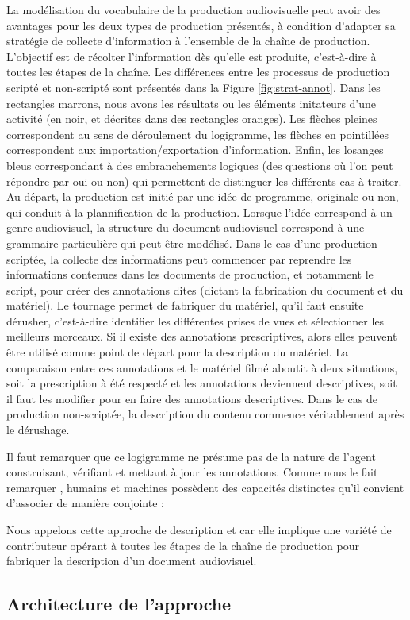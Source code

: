 La modélisation du vocabulaire de la production audiovisuelle peut avoir des avantages pour les deux types de production présentés, à condition d'adapter sa stratégie de collecte d'information à l'ensemble de la chaîne de production. 
L'objectif est de récolter l'information dès qu'elle est produite, c'est-à-dire à toutes les étapes de la chaîne. 
Les différences entre les processus de production scripté et non-scripté sont présentés dans la Figure \ref{fig:strat-annot}. 
Dans les rectangles marrons, nous avons les résultats ou les éléments initateurs d'une activité (en noir, et décrites dans des rectangles oranges).
Les flèches pleines correspondent au sens de déroulement du logigramme, les flèches en pointillées correspondent aux importation/exportation d'information. 
Enfin, les losanges bleus correspondant à des embranchements logiques (des questions où l'on peut répondre par oui ou non) qui permettent de distinguer les différents cas à traiter.
Au départ, la production est initié par une idée de programme, originale ou non, qui conduit à la plannification de la production.
Lorsque l'idée correspond à un genre audiovisuel, la structure du document audiovisuel correspond à une grammaire particulière qui peut être modélisé. 
Dans le cas d'une production scriptée, la collecte des informations peut commencer par reprendre les informations contenues dans les documents de production, et notamment le script, pour créer des annotations dites  (dictant la fabrication du document et du matériel).
Le tournage permet de fabriquer du matériel, qu'il faut ensuite dérusher, c'est-à-dire identifier les différentes prises de vues et sélectionner les meilleurs morceaux. 
Si il existe des annotations prescriptives, alors elles peuvent être utilisé comme point de départ pour la description du matériel.
La comparaison entre ces annotations et le matériel filmé aboutit à deux situations, soit la prescription à été respecté et les annotations deviennent descriptives, soit il faut les modifier pour en faire des annotations descriptives.
Dans le cas de production non-scriptée, la description du contenu commence véritablement après le dérushage.

Il faut remarquer que ce logigramme ne présume pas de la nature de l'agent construisant, vérifiant et mettant à jour les annotations.
Comme nous le fait remarquer \citeauthor{latour:ia}, humains et machines possèdent des capacités distinctes qu'il convient d'associer de manière conjointe :

\begin{cico}
 
\end{cico} 

Nous appelons cette approche de description  et  car elle implique une variété de contributeur opérant à toutes les étapes de la chaîne de production pour fabriquer la description d'un document audiovisuel.


\subsection{Architecture de l'approche}